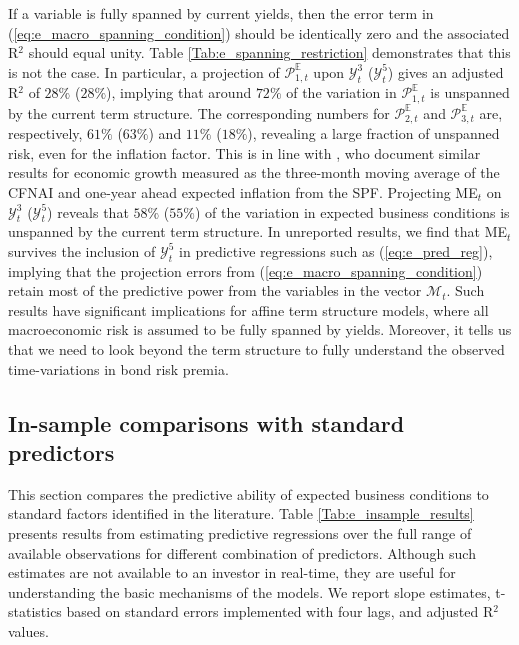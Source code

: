 \documentclass[12pt,letterpaper,leqno,doublespacing]{article}
\begin{document}
If a variable is fully spanned by current yields, then the error term in (\ref{eq:e_macro_spanning_condition}) should be identically zero and the associated R$^{2}$ should equal unity. Table \ref{Tab:e_spanning_restriction} demonstrates that this is not the case. In particular, a projection of $\mathcal{P}_{1,t}^{\mathbb{E}}$ upon $\mathcal{Y}_{t}^{3}$ ($\mathcal{Y}_{t}^{5}$) gives an adjusted R$^{2}$ of $28\%$ ($28\%$), implying that around $72\%$ of the variation in $\mathcal{P}_{1,t}^{\mathbb{E}}$ is unspanned by the current term structure. The corresponding numbers for $\mathcal{P}_{2,t}^{\mathbb{E}}$ and $\mathcal{P}_{3,t}^{\mathbb{E}}$ are, respectively, $61\%$ ($63\%$) and $11\%$ ($18\%$), revealing a large fraction of unspanned risk, even for the inflation factor. This is in line with \cite{JoslinPriebschSingleton2014}, who document similar results for economic growth measured as the three-month moving average of the CFNAI and one-year ahead expected inflation from the SPF. Projecting ME$_{t}$ on $\mathcal{Y}_{t}^{3}$ ($\mathcal{Y}_{t}^{5}$) reveals that $58\%$ ($55\%$) of the variation in expected business conditions is unspanned by the current term structure. In unreported results, we find that ME$_{t}$ survives the inclusion of $\mathcal{Y}_{t}^{5}$ in predictive regressions such as (\ref{eq:e_pred_reg}), implying that the projection errors from (\ref{eq:e_macro_spanning_condition}) retain most of the predictive power from the variables in the vector $\mathcal{M}_{t}$. Such results have significant implications for affine term structure models, where all macroeconomic risk is assumed to be fully spanned by yields. Moreover, it tells us that we need to look beyond the term structure to fully understand the observed time-variations in bond risk premia.


\subsection{In-sample comparisons with standard predictors}\label{Sec:e_is_res}
This section compares the predictive ability of expected business conditions to standard factors identified in the literature. Table \ref{Tab:e_insample_results} presents results from estimating predictive regressions over the full range of available observations for different combination of predictors. Although such estimates are not available to an investor in real-time, they are useful for understanding the basic mechanisms of the models. We report slope estimates, t-statistics based on \cite{HansenHodrick1980} standard errors implemented with four lags, and adjusted R$^{2}$ values.
\end{document}
